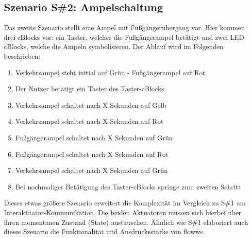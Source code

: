 \subsection{Szenario S\#2: Ampelschaltung}
Das zweite Szenario stellt eine Ampel mit Füßgängerübergang vor. Hier kommen drei cBlocks vor: ein Taster, welcher die Fußgängerampel betätigt und zwei LED-cBlocks, welche die Ampeln symbolisieren. Der Ablauf wird im Folgenden beschrieben: 
\begin{enumerate}
    \item Verkehrsampel steht initial auf Grün - Fußgängerampel auf Rot
    \item Der Nutzer betätigt ein Taster des Taster-cBlocks
    \item Verkehrsampel schaltet nach X Sekunden auf Gelb
    \item Verkehrsampel schaltet nach X Sekunden auf Rot
    \item Fußgängerampel schaltet nach X Sekunden auf Grün
    \item Fußgängerampel schaltet nach X Sekunden auf Rot
    \item Verkehrsampel schaltet nach X Sekunden auf Grün
    \item Bei nochmaliger Betätigung des Taster-cBlocks springe zum zweiten Schritt
\end{enumerate}
Dieses etwas größere Szenario erweitert die Komplexität im Vergleich zu S\#1 um Interaktuator-Kommunikation. Die beiden Aktuatoren müssen sich hierbei über ihren momentanen Zustand (State) austauschen. Ähnlich wie S\#1 elaboriert auch dieses Szenario die Funktionalität und Ausdrucksstärke von flowws.

